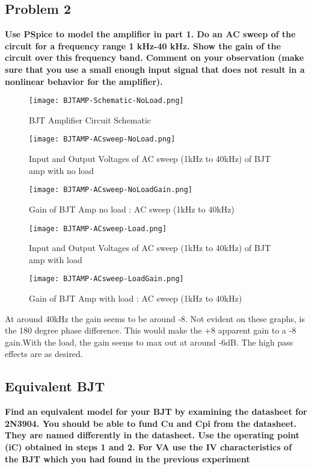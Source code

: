 \documentclass{article}
\begin{document}
\subsection*{Problem 2}
\textbf{
Use PSpice to model the amplifier in part 1. Do an AC sweep of the circuit for a
frequency range 1 kHz-40 kHz. Show the gain of the circuit over this frequency
band. Comment on your observation (make sure that you use a small enough input
signal that does not result in a nonlinear behavior for the amplifier). 
}
\begin{figure}[H]
  \centering
  \texttt{[image: BJTAMP-Schematic-NoLoad.png]}
  \caption{BJT Amplifier Circuit Schematic}
\end{figure}
\begin{figure}[H]
  \centering
  \texttt{[image: BJTAMP-ACsweep-NoLoad.png]}
  \caption{Input and Output Voltages of AC sweep (1kHz to 40kHz) of BJT amp with no load }
\end{figure}
\begin{figure}[H]
  \centering
  \texttt{[image: BJTAMP-ACsweep-NoLoadGain.png]}
  \caption{Gain of BJT Amp  no load : AC sweep (1kHz to 40kHz) }
\end{figure}
\begin{figure}[H]
  \centering
  \texttt{[image: BJTAMP-ACsweep-Load.png]}
  \caption{Input and Output Voltages of AC sweep (1kHz to 40kHz) of BJT amp with load }
\end{figure}
\begin{figure}[H]
  \centering
  \texttt{[image: BJTAMP-ACsweep-LoadGain.png]}
  \caption{Gain of BJT Amp with load : AC sweep (1kHz to 40kHz) }
\end{figure}

At around 40kHz the gain seems to be around -8.  Not evident on these graphs, is the 180 degree phase
difference. This would make the +8 apparent gain to a -8 gain.With the load, the gain 
seems to max out at around -6dB. The high pass effects are as desired.

\subsection*{Equivalent BJT}
\textbf{
Find an equivalent model for your BJT by examining the datasheet for 2N3904.
You should be able to fund Cu and Cpi from the datasheet. They are named
differently in the datasheet. Use the operating point (iC) obtained in steps 1 and 2.
For VA use the IV characteristics of the BJT which you had found in the previous
experiment
}
\end{document}
